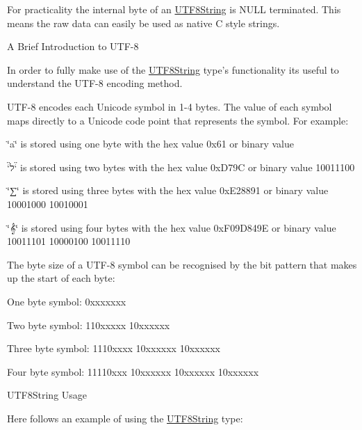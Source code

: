 For practicality the internal byte of an \hyperlink{classchaos_1_1uni_1_1_u_t_f8_string}{U\-T\-F8\-String} is N\-U\-L\-L terminated. This means the raw data can easily be used as native C style strings.

\begin{DoxyParagraph}{A Brief Introduction to U\-T\-F-\/8}

\end{DoxyParagraph}
In order to fully make use of the \hyperlink{classchaos_1_1uni_1_1_u_t_f8_string}{U\-T\-F8\-String} type's functionality its useful to understand the U\-T\-F-\/8 encoding method.

U\-T\-F-\/8 encodes each Unicode symbol in 1-\/4 bytes. The value of each symbol maps directly to a Unicode code point that represents the symbol. For example\-:


\begin{DoxyItemize}
\item \char`\"{}a\char`\"{} is stored using one byte with the hex value 0x61 or binary value {}
\item \char`\"{}ל\char`\"{} is stored using two bytes with the hex value 0x\-D79\-C or binary value { 10011100}
\item \char`\"{}∑\char`\"{} is stored using three bytes with the hex value 0x\-E28891 or binary value { 10001000 10010001}
\item \char`\"{}𝄞\char`\"{} is stored using four bytes with the hex value 0x\-F09\-D849\-E or binary value { 10011101 10000100 10011110}
\end{DoxyItemize}

The byte size of a U\-T\-F-\/8 symbol can be recognised by the bit pattern that makes up the start of each byte\-:


\begin{DoxyItemize}
\item One byte symbol\-: {\ttfamily 0xxxxxxx}
\item Two byte symbol\-: {\ttfamily 110xxxxx 10xxxxxx}
\item Three byte symbol\-: {\ttfamily 1110xxxx 10xxxxxx 10xxxxxx}
\item Four byte symbol\-: {\ttfamily 11110xxx 10xxxxxx 10xxxxxx 10xxxxxx}
\end{DoxyItemize}

\begin{DoxyParagraph}{U\-T\-F8\-String Usage}

\end{DoxyParagraph}
Here follows an example of using the \hyperlink{classchaos_1_1uni_1_1_u_t_f8_string}{U\-T\-F8\-String} type\-:

